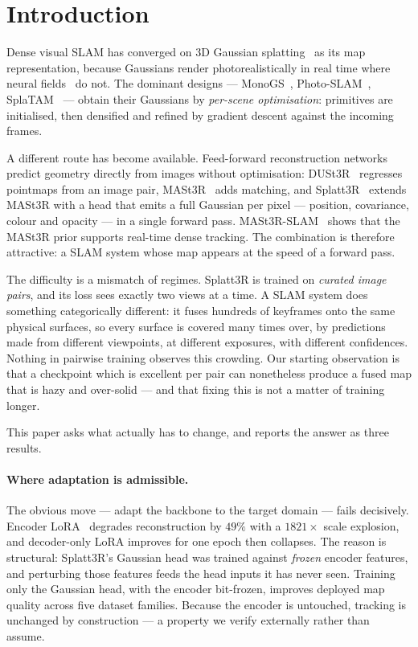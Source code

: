 \section{Introduction}
\label{sec:intro}

Dense visual SLAM has converged on 3D Gaussian splatting~\cite{kerbl20233dgs}
as its map representation, because Gaussians render photorealistically in real
time where neural fields~\cite{mildenhall2020nerf} do not. The dominant
designs --- MonoGS~\cite{matsuki2024monogs},
Photo-SLAM~\cite{huang2024photoslam}, SplaTAM~\cite{keetha2024splatam} ---
obtain their Gaussians by \emph{per-scene optimisation}: primitives are
initialised, then densified and refined by gradient descent against the
incoming frames.

A different route has become available. Feed-forward reconstruction networks
predict geometry directly from images without optimisation:
DUSt3R~\cite{wang2024dust3r} regresses pointmaps from an image pair,
MASt3R~\cite{leroy2024mast3r} adds matching, and
Splatt3R~\cite{smart2024splatt3r} extends MASt3R with a head that emits a full
Gaussian per pixel --- position, covariance, colour and opacity --- in a single
forward pass. MASt3R-SLAM~\cite{murai2025mast3rslam} shows that the MASt3R
prior supports real-time dense tracking. The combination is therefore
attractive: a SLAM system whose map appears at the speed of a forward pass.

The difficulty is a mismatch of regimes. Splatt3R is trained on
\emph{curated image pairs}, and its loss sees exactly two views at a time. A
SLAM system does something categorically different: it fuses hundreds of
keyframes onto the same physical surfaces, so every surface is covered many
times over, by predictions made from different viewpoints, at different
exposures, with different confidences. Nothing in pairwise training observes
this crowding. Our starting observation is that a checkpoint which is
excellent per pair can nonetheless produce a fused map that is hazy and
over-solid --- and that fixing this is not a matter of training longer.

This paper asks what actually has to change, and reports the answer as three
results.

\paragraph{Where adaptation is admissible.}
The obvious move --- adapt the backbone to the target domain --- fails
decisively. Encoder LoRA~\cite{hu2022lora} degrades reconstruction by $49\%$
with a $1821\times$ scale explosion, and decoder-only LoRA improves for one
epoch then collapses. The reason is structural: Splatt3R's Gaussian head was
trained against \emph{frozen} encoder features, and perturbing those features
feeds the head inputs it has never seen. Training only the Gaussian head, with
the encoder bit-frozen, improves deployed map quality across five dataset
families. Because the encoder is untouched, tracking is unchanged by
construction --- a property we verify externally rather than assume.

